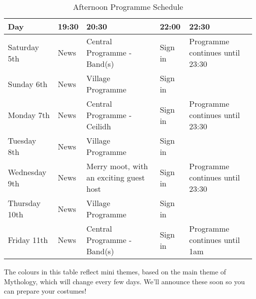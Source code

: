 \documentclass[a4paper, 11pt]{report}
\begin{document}
\begin{table}[H]
    \centering
    {\RaggedRight
    \begin{tabular}{p{} p{} p{} p{} p{}}
    \textbf{Day} & \textbf{19:30} & \textbf{20:30} & \textbf{22:00} & \textbf{22:30} \\
    \hline
    Saturday 5th & News & \cellcolor[HTML]{46BDC6}Central Programme  - Band(s) & Sign in & \cellcolor[HTML]{46BDC6}Programme continues until 23:30 \\
    \hline
    Sunday 6th & News & \cellcolor[HTML]{6AA84F}Village Programme & Sign in & \cellcolor[HTML]{6AA84F} \\
    \hline
    Monday 7th & News & \cellcolor[HTML]{6AA84F}Central Programme - Ceilidh & Sign in & \cellcolor[HTML]{6AA84F}Programme continues until 23:30 \\
    \hline
    Tuesday 8th & News & \cellcolor[HTML]{FBBC04}Village Programme & Sign in & \cellcolor[HTML]{FBBC04} \\
    \hline
    Wednesday 9th & News & \cellcolor[HTML]{FBBC04}Merry moot, with an exciting guest host & Sign in & \cellcolor[HTML]{FBBC04}Programme continues until 23:30 \\
    \hline
    Thursday 10th & News & \cellcolor[HTML]{EA4335}Village Programme & Sign in & \cellcolor[HTML]{EA4335} \\
    \hline
    Friday 11th & News & \cellcolor[HTML]{EA4335}Central Programme - Band(s) & Sign in & \cellcolor[HTML]{EA4335}Programme continues until 1am\\
    \hline
    \end{tabular}
    }%
    \caption{Afternoon Programme Schedule}
\end{table}
The colours in this table reflect mini themes, based on the main theme of Mythology, which will change every few days. We'll announce these soon so you can prepare your costumes! 
\backPage
\end{document}
